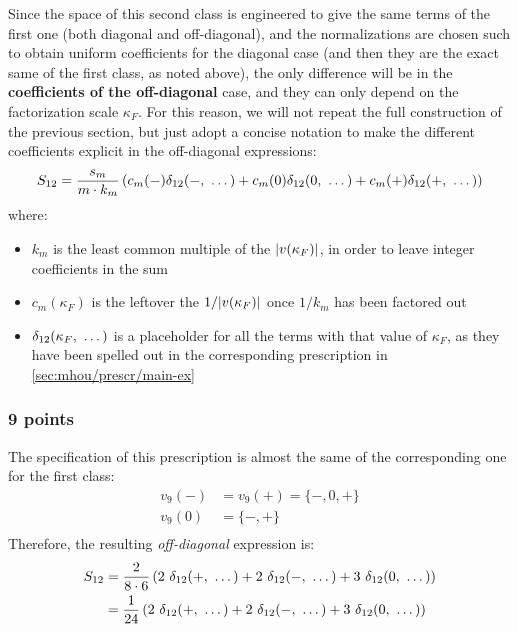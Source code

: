 Since the space of this second class is engineered to give the same terms of
the first one (both diagonal and off-diagonal), and the normalizations are
chosen such to obtain uniform coefficients for the diagonal case (and then they
are the exact same of the first class, as noted above), the only difference
will be in the \textbf{coefficients of the off-diagonal} case, and they can
only depend on the factorization scale $\kappa_F$.
For this reason, we will not repeat the full construction of the previous
section, but just adopt a concise notation to make the different coefficients
explicit in the off-diagonal expressions:
\begin{equation}
    S_{12} = \frac{s_m}{m \cdot k_m} \left(c_m(-) \delta_{12}(-,\ \dots) +
        c_m(0) \delta_{12}(0,\ \dots) + c_m(+) \delta_{12}(+,\ \dots)\right)
\end{equation}
where:
\begin{itemize}
    \item $k_m$ is the least common multiple of the $\abs{v(\kappa_F)}$, in
        order to leave integer coefficients in the sum
    \item $c_m(\kappa_F)$ is the leftover the $1/\abs{v(\kappa_F)}$ once
        $1/k_m$ has been factored out
    \item $\delta_{12}(\kappa_F,\ \dots)$ is a placeholder for all the terms with that
        value of $\kappa_F$, as they have been spelled out in the corresponding
        prescription in \cref{sec:mhou/prescr/main-ex}
\end{itemize}

\subsubsection{9 points}

The specification of this prescription is almost the same of the corresponding
one for the first class:
\begin{align}
    \label{eq:5specs-slices}
    v_9(-) &= v_9(+) = \{-, 0, +\}\\
    v_9(0) &= \{-, +\}\\
\end{align}
Therefore, the resulting \textit{off-diagonal} expression is:
\begin{align}
    S_{12} &= \frac{2}{8 \cdot 6} \left(2\ \deltagroup{+} + 2\ \deltagroup{-} + 3\ \deltagroup{0}\right)\\
        &= \frac{1}{24} \left(2\ \deltagroup{+} + 2\ \deltagroup{-} + 3\ \deltagroup{0}\right)
\end{align}

